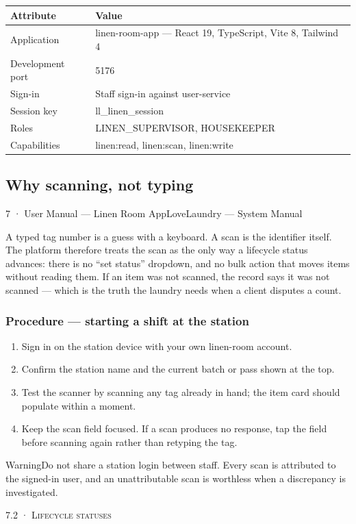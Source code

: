 \documentclass[11pt,a4paper,oneside]{book}
\begin{document}
\begin{center}\small
\begin{tabularx}{\linewidth}{|X|X|}
\hline
\rowcolor{lightgrey}
\textbf{Attribute} & \textbf{Value} \\ \hline
Application & linen-room-app — React 19, TypeScript, Vite 8, Tailwind 4 \\ \hline
Development port & 5176 \\ \hline
Sign-in & Staff sign-in against user-service \\ \hline
Session key & ll\_linen\_session \\ \hline
Roles & LINEN\_SUPERVISOR, HOUSEKEEPER \\ \hline
Capabilities & linen:read, linen:scan, linen:write \\ \hline
\end{tabularx}
\end{center}
\subsection*{Why scanning, not typing}
7 · User Manual — Linen Room AppLoveLaundry — System Manual

A typed tag number is a guess with a keyboard. A scan is the identifier itself. The platform therefore treats the scan as the only way a lifecycle status advances: there is no “set status” dropdown, and no bulk action that moves items without reading them. If an item was not scanned, the record says it was not scanned — which is the truth the laundry needs when a client disputes a count.

\subsubsection*{Procedure — starting a shift at the station}
\begin{enumerate}
\item Sign in on the station device with your own linen-room account.
\item Confirm the station name and the current batch or pass shown at the top.
\item Test the scanner by scanning any tag already in hand; the item card should populate within a moment.
\item Keep the scan field focused. If a scan produces no response, tap the field before scanning again rather than retyping the tag.
\end{enumerate}
\begin{notebox}WarningDo not share a station login between staff. Every scan is attributed to the signed-in user, and an unattributable scan is worthless when a discrepancy is investigated.\end{notebox}
\textsc{\small\color{crimson}7.2 · Lifecycle statuses}\par\medskip
\end{document}
